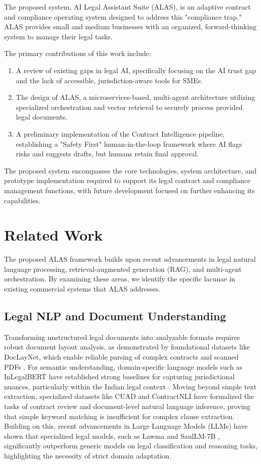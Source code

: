The proposed system, AI Legal Assistant Suite (ALAS), is an adaptive contract and compliance operating system designed to address this "compliance trap." ALAS provides small and medium businesses with an organized, forward-thinking system to manage their legal tasks.

The primary contributions of this work include:
\begin{enumerate}
\item A review of existing gaps in legal AI, specifically focusing on the AI trust gap and the lack of accessible, jurisdiction-aware tools for SMEs.
\item The design of ALAS, a microservices-based, multi-agent architecture utilizing specialized orchestration and vector retrieval to securely process provided legal documents.
\item A preliminary implementation of the Contract Intelligence pipeline, establishing a "Safety First" human-in-the-loop framework where AI flags risks and suggests drafts, but humans retain final approval.
\end{enumerate}

The proposed system encompasses the core technologies, system architecture, and prototype implementation required to support its legal contract and compliance management functions, with future development focused on further enhancing its capabilities.


\section{Related Work}
The proposed ALAS framework builds upon recent advancements in legal natural language processing, retrieval-augmented generation (RAG), and multi-agent orchestration. By examining these areas, we identify the specific lacunae in existing commercial systems that ALAS addresses.

\subsection{Legal NLP and Document Understanding}
Transforming unstructured legal documents into analyzable formats requires robust document layout analysis, as demonstrated by foundational datasets like DocLayNet, which enable reliable parsing of complex contracts and scanned PDFs \cite{pfitzmann2022doclaynet}. For semantic understanding, domain-specific language models such as InLegalBERT have established strong baselines for capturing jurisdictional nuances, particularly within the Indian legal context \cite{paul2022inlegalbert}. Moving beyond simple text extraction, specialized datasets like CUAD \cite{hendrycks2021cuad} and ContractNLI \cite{koreeda2021contractnli} have formalized the tasks of contract review and document-level natural language inference, proving that simple keyword matching is insufficient for complex clause extraction. Building on this, recent advancements in Large Language Models (LLMs) have shown that specialized legal models, such as Lawma \cite{dominguez2024lawma} and SaulLM-7B \cite{colombo2024saullm}, significantly outperform generic models on legal classification and reasoning tasks, highlighting the necessity of strict domain adaptation.

